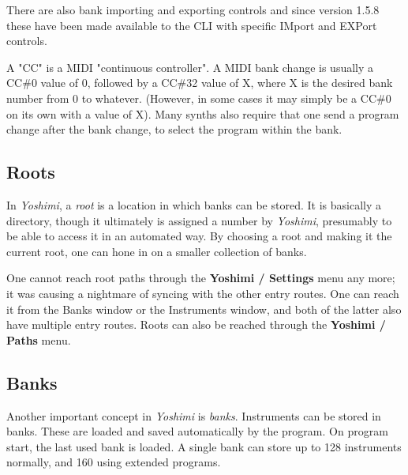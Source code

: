    There are also bank importing and exporting controls and since version 1.5.8
   these have been made available to the CLI with specific IMport and EXPort
   controls.

   A "CC" is a MIDI "continuous controller".
   A MIDI bank change is usually a CC\#0 value of 0, followed by a CC\#32
   value of X, where X is the desired bank number from 0 to whatever.
   (However, in some cases it may simply be a CC\#0 on its own with a value
    of X).  Many synths also require that one send a program change after
   the bank change, to select the program within the bank.

\subsection{Roots}
\label{subsec:banks_and_roots_roots}

   In \textsl{Yoshimi}, a \textsl{root} is a location in which banks can be
   stored.  It is basically a directory, though it ultimately is assigned a
   number by \textsl{Yoshimi}, presumably to be able to access it in an
   automated way.  By choosing a root and making it the current root, one
   can hone in on a smaller collection of banks.

   One cannot reach root paths through the \textbf{Yoshimi / Settings} menu
   any more; it was causing a nightmare of syncing with the other entry
   routes. One can reach it from the Banks window
   or the Instruments window,
   and both of the latter also have multiple entry routes.
   Roots can also be reached through the \textbf{Yoshimi / Paths} menu.

\subsection{Banks}
\label{subsec:banks_and_roots_banks}

   Another important concept in \textsl{Yoshimi} is \textsl{banks}.  Instruments
   can be stored in banks. These are loaded and saved automatically by the
   program.  On program start, the last used bank is loaded. A single bank
   can store up to 128 instruments normally, and 160 using extended programs.


